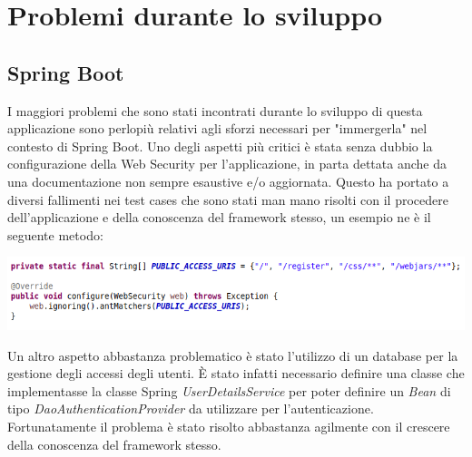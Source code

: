\section{Problemi durante lo sviluppo}

\subsection{Spring Boot}
I maggiori problemi che sono stati incontrati durante lo sviluppo di questa applicazione sono perlopiù relativi agli sforzi necessari per "immergerla" nel contesto di Spring Boot.\newline
Uno degli aspetti più critici è stata senza dubbio la configurazione della Web Security per l'applicazione, in parta dettata anche da una documentazione non sempre esaustive e/o aggiornata. Questo ha portato a diversi fallimenti nei test cases che sono stati man mano risolti con il procedere dell'applicazione e della conoscenza del framework stesso, un esempio ne è il seguente metodo:

\vspace{1cm}

\begin{minipage}{\linewidth}
	\includegraphics[width=\textwidth]{img/websecurity.png}
\end{minipage}

\vspace{1cm}

Un altro aspetto abbastanza problematico è stato l'utilizzo di un database per la gestione degli accessi degli utenti. È stato infatti necessario definire una classe che implementasse la classe Spring \textsl{UserDetailsService} per poter definire un \textsl{Bean} di tipo \textsl{DaoAuthenticationProvider} da utilizzare per l'autenticazione. Fortunatamente il problema è stato risolto abbastanza agilmente con il crescere della conoscenza del framework stesso.

